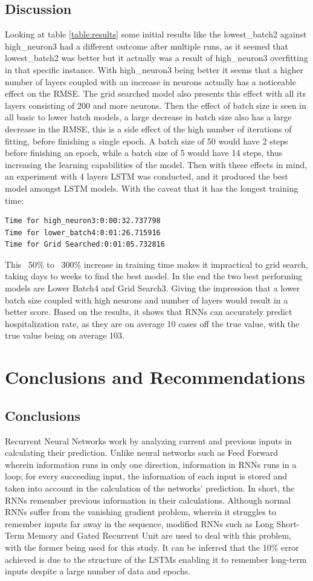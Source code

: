 \documentclass[10pt,11pt,12pt,oneside]{book}
\begin{document}
\section{Discussion}
    Looking at table \ref{table:results} some initial results like the lowest\_batch2 against high\_neuron3 had a different outcome after multiple runs, as it seemed that lowest\_batch2 was better but it actually was a result of high\_neuron3 overfitting in that specific instance. With high\_neuron3 being better it seems that a higher number of layers coupled with an increase in neurons actually has a noticeable effect on the RMSE. The grid searched model also presents this effect with all its layers consisting of 200 and more neurons. Then the effect of batch size is seen in all basic to lower batch models, a large decrease in batch size also has a large decrease in the RMSE, this is a side effect of the high number of iterations of fitting, before finishing a single epoch. A batch size of 50 would have 2 steps before finishing an epoch, while a batch size of 5 would have 14 steps, thus increasing the learning capabilities of the model. Then with these effects in mind, an experiment with 4 layers LSTM was conducted, and it produced the best model amongst LSTM models. With the caveat that it has the longest training time: \begin{verbatim}
Time for high_neuron3:0:00:32.737798
Time for lower_batch4:0:01:26.715916
Time for Grid Searched:0:01:05.732816
    \end{verbatim}
    This ~50\% to ~300\% increase in training time makes it impractical to grid search, taking days to weeks to find the best model.
    In the end the two best performing models are Lower Batch4 and Grid Search3. Giving the impression that a lower batch size coupled with high neurons and number of layers would result in a better score. Based on the results, it shows that RNNs can accurately predict hospitalization rate, as they are on average 10 cases off the true value, with the true value being on average 103.
\chapter{Conclusions and Recommendations}
\section{Conclusions}
Recurrent Neural Networks work by analyzing current and previous inputs in calculating their prediction. Unlike neural networks such as Feed Forward wherein information runs in only one direction, information in RNNs runs in a loop; for every succeeding input, the information of each input is stored and taken into account in the calculation of the networks' prediction. In short, the RNNs remember previous information in their calculations. Although normal RNNs suffer from the vanishing gradient problem, wherein it struggles to remember inputs far away in the sequence, modified RNNs such as Long Short-Term Memory and Gated Recurrent Unit are used to deal with this problem, with the former being used for this study. It can be inferred that the 10\% error achieved is due to the structure of the LSTMs enabling it to remember long-term inputs despite a large number of data and epochs. 
\end{document}

